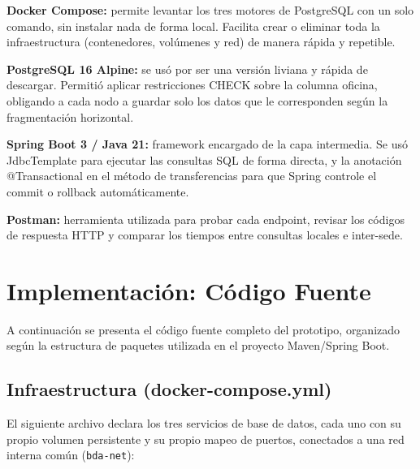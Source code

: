 \documentclass[11pt,a4paper]{article}
\begin{document}
\item \textbf{Docker Compose:} permite levantar los tres motores de PostgreSQL con un solo comando, sin instalar nada de forma local. Facilita crear o eliminar toda la infraestructura (contenedores, volúmenes y red) de manera rápida y repetible.


\item \textbf{PostgreSQL 16 Alpine:} se usó por ser una versión liviana y rápida de descargar. Permitió aplicar restricciones CHECK sobre la columna oficina, obligando a cada nodo a guardar solo los datos que le corresponden según la fragmentación horizontal.


\item \textbf{Spring Boot 3 / Java 21:} framework encargado de la capa intermedia. Se usó JdbcTemplate para ejecutar las consultas SQL de forma directa, y la anotación @Transactional en el método de transferencias para que Spring controle el commit o rollback automáticamente.


\item \textbf{Postman:} herramienta utilizada para probar cada endpoint, revisar los códigos de respuesta HTTP y comparar los tiempos entre consultas locales e inter-sede.


\section{Implementación: Código Fuente}

A continuación se presenta el código fuente completo del prototipo, organizado según la estructura de paquetes utilizada en el proyecto Maven/Spring Boot.

\subsection{Infraestructura (docker-compose.yml)}
El siguiente archivo declara los tres servicios de base de datos, cada uno con su propio volumen persistente y su propio mapeo de puertos, conectados a una red interna común (\texttt{bda-net}):
\end{document}
